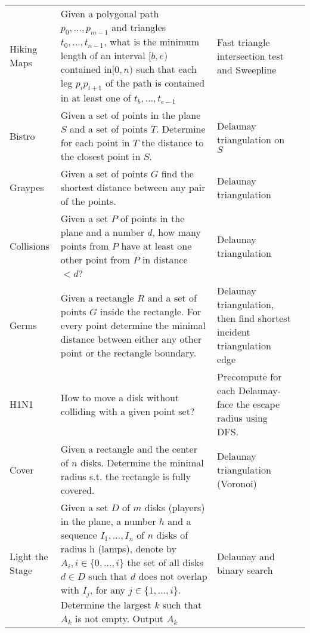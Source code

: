 \documentclass[a4paper, 10pt]{article}
\begin{document}
\begin{longtable}{ L{2cm} L{8cm} L{4cm} r}
        Hiking Maps 
        & Given a polygonal path $p_0,\dots,p_{m-1}$ and triangles $t_0,\dots,t_{n-1}$, what is the minimum length of 
            an interval $[b,e)$contained in$[0,n)$ such that each leg $p_ip_{i+1}$ of the path is contained in at least one of
                    $t_b,\dots,t_{e-1}$
        & Fast triangle intersection test and Sweepline &  \pageref{sec:hiking_maps} \\

        Bistro 
        & Given a set of points in the plane $S$ and a set of points $T$. Determine for each point in $T$ the distance to the closest point in $S$.
        & Delaunay triangulation on $S$ &  \pageref{sec:bistro} \\

        Graypes 
        & Given a set of points $G$ find the shortest distance between any pair of the points.
        & Delaunay triangulation & \pageref{sec:graypes} \\

        Collisions 
        & Given a set $P$ of points in the plane and a number $d$, 
            how many points from $P$ have at least one other point from $P$ in distance $<d$?        
        & Delaunay triangulation &  \pageref{sec:collisions} \\

        Germs 
        & Given a rectangle $R$ and a set of points $G$ inside the rectangle. For every point determine the minimal distance between either any other 
            point or the rectangle boundary.
        & Delaunay triangulation, then find shortest incident triangulation edge & \pageref{sec:germs} \\

        H1N1
        & How to move a disk without colliding with a given point set?
        & Precompute for each Delaunay-face the escape radius using DFS. &  \pageref{sec:h1n1} \\

        Cover 
        & Given a rectangle and the center of $n$ disks. Determine the minimal radius s.t. the rectangle is fully covered.
        & Delaunay triangulation (Voronoi) &  \pageref{sec:cover} \\

        Light the Stage 
        & Given a set $D$ of $m$ disks (players) in the plane, a number $h$ and a sequence $I_1,\dots,I_n$ 
            of $n$ disks of radius h (lamps), denote by $A_i, i\in \{0,\dots,i\}$ the set of all disks $d\in D$ 
            such that $d$ does not overlap with $I_j$, for any $j\in \{1,\dots,i\}$.
            Determine the largest $k$ such that $A_k$ is not empty. Output $A_k$
            & Delaunay and binary search &  \pageref{sec:light_the_stage} \\


\end{longtable}
\end{document}
